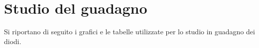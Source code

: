 \section{Studio del guadagno}
Si riportano di seguito i grafici e le tabelle utilizzate per lo studio in guadagno dei diodi.

